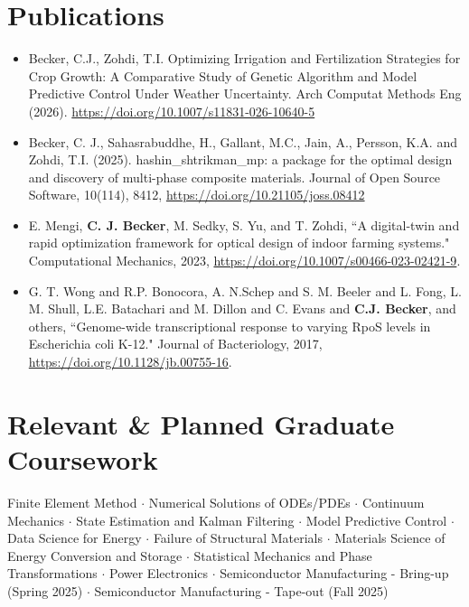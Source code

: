 \documentclass[letterpaper,10.8pt]{article}
\newcommand{\resumeItemNoTitle}[2]{\item\small{\textbf{#1}{ #2 \vspace{-2pt}}}}
\newcommand{\resumeSubItemNoTitle}[2]{\resumeItemNoTitle{#1}{#2}\vspace{-4pt}}
\newcommand{\resumeSubHeadingListStart}{\begin{itemize}[leftmargin=*]}
\newcommand{\resumeSubHeadingListEnd}{\end{itemize}}
\begin{document}
\section{Publications}
\resumeSubHeadingListStart
\resumeSubItemNoTitle{}{Becker, C.J., Zohdi, T.I. Optimizing Irrigation and Fertilization Strategies for Crop Growth: A Comparative Study of Genetic Algorithm and Model Predictive Control Under Weather Uncertainty. Arch Computat Methods Eng (2026). \url{https://doi.org/10.1007/s11831-026-10640-5}}
\resumeSubItemNoTitle{}{Becker, C. J., Sahasrabuddhe, H., Gallant, M.C., Jain, A., Persson, K.A. and Zohdi, T.I. (2025). hashin\_shtrikman\_mp: a package for the optimal design and discovery of multi-phase composite materials. Journal of Open Source Software, 10(114), 8412, \url{https://doi.org/10.21105/joss.08412}}
\resumeSubItemNoTitle{}{E. Mengi, \textbf{C. J. Becker}, M. Sedky, S. Yu, and T. Zohdi, ``A digital-twin and rapid optimization framework for optical design of indoor farming systems." Computational Mechanics, 2023, \url{https://doi.org/10.1007/s00466-023-02421-9}.}
\resumeSubItemNoTitle{}{G. T. Wong and R.P. Bonocora, A. N.Schep and S. M. Beeler and L. Fong, L. M. Shull, L.E. Batachari and M. Dillon and C. Evans and \textbf{C.J. Becker}, and others, ``Genome-wide transcriptional response to varying RpoS levels in Escherichia coli K-12." Journal of Bacteriology, 2017, \url{https://doi.org/10.1128/jb.00755-16}.}
\resumeSubHeadingListEnd

\section{Relevant \& Planned Graduate Coursework}
\small{
Finite Element Method $\cdot$ 
Numerical Solutions of ODEs/PDEs $\cdot$ 
Continuum Mechanics $\cdot$ 
State Estimation and Kalman Filtering  $\cdot$
Model Predictive Control  $\cdot$
Data Science for Energy $\cdot$
Failure of Structural Materials $\cdot$
Materials Science of Energy Conversion and Storage $\cdot$
Statistical Mechanics and Phase Transformations $\cdot$
Power Electronics $\cdot$
Semiconductor Manufacturing - Bring-up (Spring 2025) $\cdot$
Semiconductor Manufacturing - Tape-out (Fall 2025)
}
\end{document}

